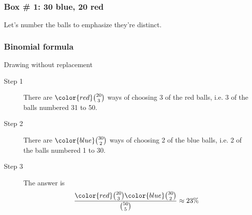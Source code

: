 \documentclass[handout]{beamer}
\begin{document}


   \begin{frame}
   \frametitle{Box \# 1: 30 blue, 20 red}
   \begin{center}
   \end{center}
   Let's number the balls to emphasize they're distinct.
   \end{frame}


   \begin{frame} \frametitle{Binomial formula}

   \begin{block}
   {Drawing without replacement}

   \begin{description}
   \item[Step 1] There are ${\color{red} \binom{20}{3}}$ ways of choosing
   3 of the red balls, i.e. 3 of the balls numbered 31 to 50.

   \item[Step 2] There are ${\color{blue} \binom{30}{2}}$ ways of choosing
   2 of the blue balls, i.e. 2 of the balls numbered 1 to 30.

   \item[Step 3] The answer is
     $$
     \frac{{\color{red} \binom{20}{3}}{\color{blue} \binom{30}{2}}}{\binom{50}{5}} \approx  23\%
     $$


   \end{description}
   \end{block}
   \end{frame}


   \begin{frame} 

   \end{frame}

   
\end{document}
